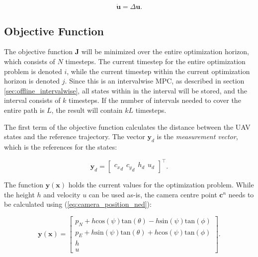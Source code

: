 \begin{equation}
	\label{eq:control_relation}
	\mathbf{\dot{u}} = \Delta\mathbf{u}.
\end{equation}


\subsection{Objective Function}

The objective function $\mathbf{J}$ will be minimized over the entire optimization horizon, which consists of $N$ timesteps. The current timestep for the entire optimization problem is denoted $i$, while the current timestep within the current optimization horizon is denoted $j$. Since this is an intervalwise MPC, as described in section \ref{sec:offline_intervalwise}, all states within in the interval will be stored, and the interval consists of $k$ timesteps. If the number of intervals needed to cover the entire path is $L$, the result will contain $kL$ timesteps.

The first term of the objective function calculates the distance between the UAV states and the reference trajectory. The vector $\mathbf{y}_d$ is the \textit{measurement vector}, which is the references for the states:
	
\begin{equation}
	\mathbf{y}_d =
	\begin{bmatrix}
		{c_x}_d \hspace{5pt} {c_y}_d \hspace{5pt} h_d \hspace{5pt} u_d
	\end{bmatrix}^\intercal .
\end{equation}

The function $\mathbf{y}(\mathbf{x})$ holds the current values for the optimization problem. While the height $h$ and velocity $u$ can be used as-is, the camera centre point $\mathbf{c}^n$ needs to be calculated using (\ref{eq:camera_position_ned}):

\begin{equation}
	\mathbf{y}(\mathbf{x}) =
	\begin{bmatrix}
		p_N + h\text{cos}(\psi)\text{tan}(\theta) - h\text{sin}(\psi)\text{tan}(\phi)\\
		p_E + h\text{sin}(\psi)\text{tan}(\theta) + h\text{cos}(\psi)\text{tan}(\phi)\\
		h \\
		u
	\end{bmatrix}.
\end{equation}

